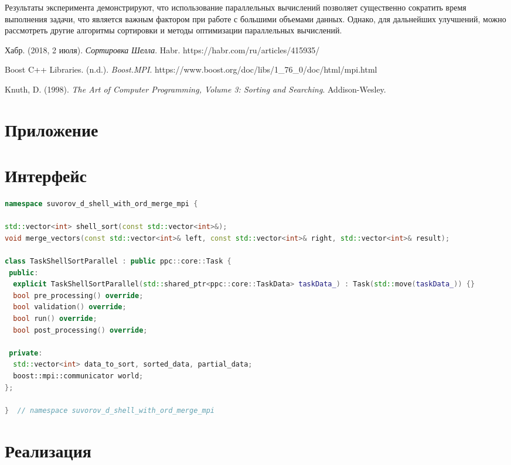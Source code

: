 \documentclass{report}
\begin{document}
Результаты эксперимента демонстрируют, что использование параллельных вычислений позволяет существенно сократить время выполнения задачи, что является важным фактором при работе с большими объемами данных. Однако, для дальнейших улучшений, можно рассмотреть другие алгоритмы сортировки и методы оптимизации параллельных вычислений.

\newpage
\begin{thebibliography}{1}
   Хабр. (2018, 2 июля). \textit{Сортировка Шелла}. Habr. https://habr.com/ru/articles/415935/

   Boost C++ Libraries. (n.d.). \textit{Boost.MPI}. https://www.boost.org/doc/libs/1\_76\_0/doc/html/mpi.html

   Knuth, D. (1998). \textit{The Art of Computer Programming, Volume 3: Sorting and Searching}. Addison-Wesley.
  \end{thebibliography}
\newpage

\section*{Приложение}
\section*{Интерфейс}

\begin{lstlisting}[language=C++, caption={Интерфейс}]
namespace suvorov_d_shell_with_ord_merge_mpi {

std::vector<int> shell_sort(const std::vector<int>&);
void merge_vectors(const std::vector<int>& left, const std::vector<int>& right, std::vector<int>& result);

class TaskShellSortParallel : public ppc::core::Task {
 public:
  explicit TaskShellSortParallel(std::shared_ptr<ppc::core::TaskData> taskData_) : Task(std::move(taskData_)) {}
  bool pre_processing() override;
  bool validation() override;
  bool run() override;
  bool post_processing() override;

 private:
  std::vector<int> data_to_sort, sorted_data, partial_data;
  boost::mpi::communicator world;
};

}  // namespace suvorov_d_shell_with_ord_merge_mpi
\end{lstlisting}

\section*{Реализация}
\end{document}
